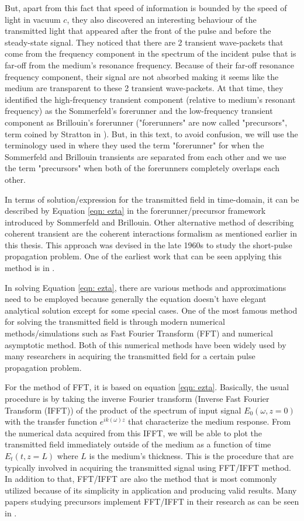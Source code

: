 But, apart from this fact that speed of information is bounded by the speed of light in vacuum $c$, they also discovered an interesting behaviour of the transmitted light that appeared after the front of the pulse and before the steady-state signal. They noticed that there are 2 transient wave-packets that come from the frequency component in the spectrum of the incident pulse that is far-off from the medium's resonance frequency. Because of their far-off resonance frequency component, their signal are not absorbed making it seems like the medium are transparent to these 2 transient wave-packets. At that time, they identified the high-frequency transient component (relative to medium's resonant frequency) as the Sommerfeld's forerunner and the low-frequency transient component as Brillouin's forerunner ("forerunners" are now called "precursors", term coined by Stratton in \cite{Stratton1941}). But, in this text, to avoid confusion, we will use the terminology used in \cite{Macke2013} where they used the term "forerunner" for when the Sommerfeld and Brillouin transients are separated from each other and we use the term "precursors" when both of the forerunners completely overlaps each other.

In terms of solution/expression for the transmitted field in time-domain, it can be described by Equation \ref{eqn: ezta} in the forerunner/precursor framework introduced by Sommerfeld and Brillouin. Other alternative method of describing coherent transient are the coherent interactions formalism as mentioned earlier in this thesis. This approach was devised in the late 1960s to study the short-pulse propagation problem. One of the earliest work that can be seen applying this method is in \cite{Crisp1970}.

In solving Equation \ref{eqn: ezta}, there are various methods and approximations need to be employed because generally the equation doesn't have elegant analytical solution except for some special cases. One of the most famous method for solving the transmitted field  is through modern numerical methods/simulations such as Fast Fourier Transform (FFT) and numerical asymptotic method. Both of this numerical methods have been widely used by many researchers in acquiring the transmitted field for a certain pulse propagation problem.

For the method of FFT, it is based on equation \ref{eqn: ezta}. Basically, the usual procedure is by taking the inverse Fourier transform (Inverse Fast Fourier Transform (IFFT)) of the product of the spectrum of input signal $E_{0}(\omega, z = 0)$ with the transfer function $e^{i k(\omega) z}$ that characterize the medium response. From the numerical data acquired from this IFFT, we will be able to plot the transmitted field immediately outside of the medium as a function of time $E_{t}(t, z = L)$ where $L$ is the medium's thickness. This is the procedure that are typically involved in acquiring the transmitted signal using FFT/IFFT method. In addition to that, FFT/IFFT are also the method that is most commonly utilized because of its simplicity in application and producing valid results. Many papers studying precursors implement FFT/IFFT in their research as can be seen in \cite{Chen2010, Macke2013, MacKe2009, Oughstun2010, Wei2009, Jeong2008, jeong2010slow}.

